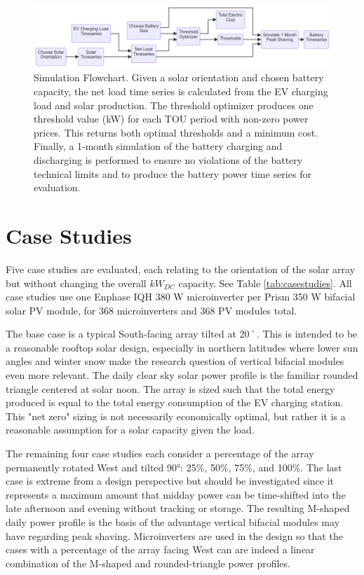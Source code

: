 \documentclass[journal,article,submit,pdftex,moreauthors]{Definitions/mdpi}
\begin{document}
\begin{figure}
  \centering
  \includegraphics[width=12cm]{./images/simulation flowchart.png}
  \caption{Simulation Flowchart. Given a solar orientation and chosen battery capacity, the net load time series is calculated from the EV charging load and solar production. The threshold optimizer produces one threshold value (kW) for each TOU period with non-zero power prices. This returns both optimal thresholds and a minimum cost. Finally, a 1-month simulation of the battery charging and discharging is performed to ensure no violations of the battery technical limits and to produce the battery power time series for evaluation.}
  \label{fig:simulation-flowchart}
\end{figure}

\section{Case Studies}\label{case-studies}%

Five case studies are evaluated, each relating to the orientation of the solar array but without changing the overall \(kW_{DC}\) capacity. See Table \ref{tab:casestudies}. All case studies use one Enphase IQH 380 W microinverter per Prism 350 W bifacial solar PV module, for 368 microinverters and 368 PV modules total.

The base case is a typical South-facing array tilted at 20˚. This is intended to be a reasonable rooftop solar design, especially in northern latitudes where lower sun angles and winter snow make the research question of vertical bifacial modules even more relevant. The daily clear sky solar power profile is the familiar rounded triangle centered at solar noon. The array is sized such that the total energy produced is equal to the total energy consumption of the EV charging station. This "net zero" sizing is not necessarily economically optimal, but rather it is a reasonable assumption for a solar capacity given the load.

The remaining four case studies each consider a percentage of the array permanently rotated West and tilted 90°: 25\%, 50\%, 75\%, and 100\%. The last case is extreme from a design perspective but should be investigated since it represents a maximum amount that midday power can be time-shifted into the late afternoon and evening without tracking or storage. The resulting M-shaped daily power profile is the basis of the advantage vertical bifacial modules may have regarding peak shaving. Microinverters are used in the design so that the cases with a percentage of the array facing West can are indeed a linear combination of the M-shaped and rounded-triangle power profiles.
\end{document}
